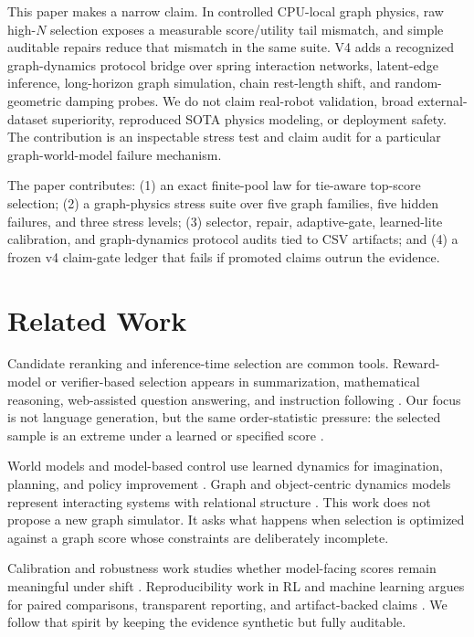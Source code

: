 \documentclass{article}
\begin{document}
This paper makes a narrow claim.  In controlled CPU-local graph physics, raw high-$N$ selection exposes a measurable score/utility tail mismatch, and simple auditable repairs reduce that mismatch in the same suite.  V4 adds a recognized graph-dynamics protocol bridge over spring interaction networks, latent-edge inference, long-horizon graph simulation, chain rest-length shift, and random-geometric damping probes.  We do not claim real-robot validation, broad external-dataset superiority, reproduced SOTA physics modeling, or deployment safety.  The contribution is an inspectable stress test and claim audit for a particular graph-world-model failure mechanism.

The paper contributes: (1) an exact finite-pool law for tie-aware top-score selection; (2) a graph-physics stress suite over five graph families, five hidden failures, and three stress levels; (3) selector, repair, adaptive-gate, learned-lite calibration, and graph-dynamics protocol audits tied to CSV artifacts; and (4) a frozen v4 claim-gate ledger that fails if promoted claims outrun the evidence.

\section{Related Work}

Candidate reranking and inference-time selection are common tools.  Reward-model or verifier-based selection appears in summarization, mathematical reasoning, web-assisted question answering, and instruction following \citep{stiennon2020learning,cobbe2021training,nakano2021webgpt,ouyang2022training}.  Our focus is not language generation, but the same order-statistic pressure: the selected sample is an extreme under a learned or specified score \citep{david2003order}.

World models and model-based control use learned dynamics for imagination, planning, and policy improvement \citep{ha2018recurrent,hafner2019planet,hafner2020dreamer}.  Graph and object-centric dynamics models represent interacting systems with relational structure \citep{battaglia2016interaction,kipf2018neural,sanchezgonzalez2020learning}.  This work does not propose a new graph simulator.  It asks what happens when selection is optimized against a graph score whose constraints are deliberately incomplete.

Calibration and robustness work studies whether model-facing scores remain meaningful under shift \citep{guo2017calibration,ovadia2019trust}.  Reproducibility work in RL and machine learning argues for paired comparisons, transparent reporting, and artifact-backed claims \citep{henderson2018deep,pineau2021improving}.  We follow that spirit by keeping the evidence synthetic but fully auditable.
\end{document}

